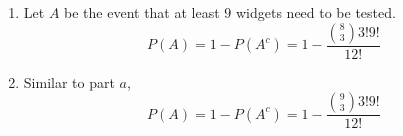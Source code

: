 \begin{enumerate}[label=(\alph*)]
\item Let $A$ be the event that at least $9$ widgets need to be tested. $$P(A) = 1 - P(A^{c}) = 1 - \frac{\binom{8}{3}3!9!}{12!}$$

\item Similar to part $a$, $$P(A) = 1 - P(A^{c}) = 1 - \frac{\binom{9}{3}3!9!}{12!}$$
\end{enumerate}